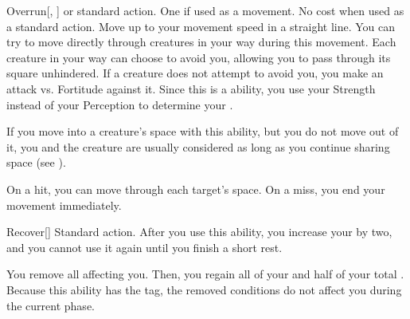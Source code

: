         \begin{activeability}{Overrun}[, ]
            \label{Overrun}
            \abilityusagetime {} or standard action.
            \abilitycost One  if used as a movement. No cost when used as a standard action.
            \rankline
            Move up to your movement speed in a straight line.
            You can try to move directly through creatures in your way during this movement.
            Each creature in your way can choose to avoid you, allowing you to pass through its square unhindered.
            If a creature does not attempt to avoid you, you make an attack vs. Fortitude against it.
            Since this is a  ability, you use your Strength instead of your Perception to determine your .

            If you move into a creature's space with this ability, but you do not move out of it, you and the creature are usually considered \squeezing as long as you continue sharing space (see ).

            On a hit, you can move through each target's space.
            On a miss, you end your movement immediately.
        \end{activeability}

        \begin{activeability}{Recover}[]
            \label{Recover}
            \abilityusagetime Standard action.
            \rankline
            After you use this ability, you increase your  by two, and you cannot use it again until you finish a short rest.

            You remove all  affecting you.
            Then, you regain all of your  and half of your total .
            Because this ability has the  tag, the removed conditions do not affect you during the current phase.
        \end{activeability}

